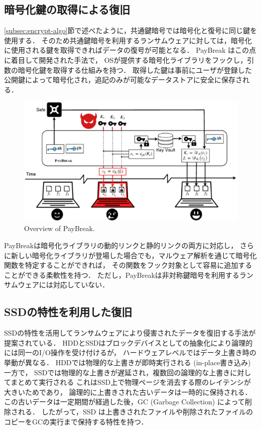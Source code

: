 \subsection{暗号化鍵の取得による復旧}
\ref{subsec:encrypt-algo}節で述べたように，共通鍵暗号では暗号化と復号に同じ鍵を使用する．
そのため共通鍵暗号を利用するランサムウェアに対しては，暗号化に使用される鍵を取得できればデータの復号が可能となる．
PayBreak \cite{kolodenker2017paybreak} はこの点に着目して開発された手法で，
OSが提供する暗号化ライブラリをフックし，引数の暗号化鍵を取得する仕組みを持つ．
取得した鍵は事前にユーザが登録した公開鍵によって暗号化され，追記のみが可能なデータストアに安全に保存される．
\begin{figure}[t]
  \begin{center}
    \includegraphics[width=\columnwidth]{doc/img/paybreak-overview.eps}
  \end{center}
  \caption{Overview of PayBreak. \cite{kolodenker2017paybreak}}
  \label{fig:paybreak-overview}
\end{figure}
PayBreakは暗号化ライブラリの動的リンクと静的リンクの両方に対応し，
さらに新しい暗号化ライブラリが登場した場合でも，マルウェア解析を通じて暗号化関数を特定することができれば，
その関数をフック対象として容易に追加することができる柔軟性を持つ．
ただし，PayBreakは非対称鍵暗号を利用するランサムウェアには対応していない．

\subsection{SSDの特性を利用した復旧}
\label{subsec:ssd-recovery}
SSDの特性を活用してランサムウェアにより侵害されたデータを復旧する手法が提案されている．
HDDとSSDはブロックデバイスとしての抽象化により論理的には同一のI/O操作を受け付けるが，
ハードウェアレベルではデータ上書き時の挙動が異なる．
HDDでは物理的な上書きが即時実行される (in-place書き込み) 一方で，
SSDでは物理的な上書きが遅延され，複数回の論理的な上書きに対してまとめて実行される
これはSSD上で物理ページを消去する際のレイテンシが大きいためであり，
論理的に上書きされた古いデータは一時的に保持される．
この古いデータは一定期間が経過した後，GC (Garbage Collection) によって削除される．
したがって，SSD は上書きされたファイルや削除されたファイルのコピーをGCの実行まで保持する特性を持つ．

